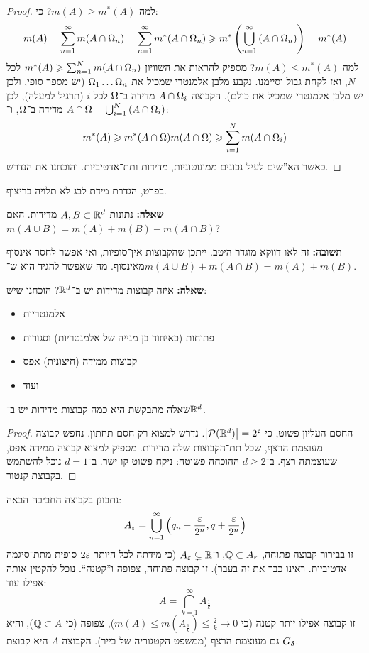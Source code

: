 \documentclass[name=רשימות פונקציות ממשיות – WIP]{../../../tex/classes/noChapterMegasumPreamble}
\begin{document}
	\begin{proof}
		למה $m(A) \ge m^*(A)$? כי: 
		\[ m(A) = \sum_{n =1}^{\infty}m(A \cap \Omega _n) = \sum_{n = 1}^{\infty}m^*(A \cap \Omega_n) \geqslant m^*\left ( \bigcup_{n = 1}^{\infty}\left ( A \cap \Omega _n \right ) \right ) = m^*(A) \]
		למה $m(A) \le m^*(A)$? מספיק להראות את השוויון $m^*(A) \geqslant \sum_{n = 1}^{N}m(A \cap \Omega _n)$ לכל $N$, ואז לקחת גבול וסיימנו. נקבע מלבן אלמנטרי שמכיל את $\Omega_1 \dots \Omega_n$ (יש מספר סופי, ולכן יש מלבן אלמנטרי שמכיל את כולם). הקבוצה $A \cap \Omega_i$ מדידה ב־$\Omega$ לכל $i$ (תרגיל למעלה), לכן $A \cap \Omega = \bigcup_{i = 1}^{N}\left ( A \cap \Omega_i \right )$ מדידה ב־$\Omega$, ו־: 
		\[ m^*(A) \geqslant m^*(A \cap \Omega) m(A \cap \Omega) \geqslant \sum_{i =1}^{N}m(A \cap \Omega_i) \]
		כאשר הא''שים לעיל נכונים ממונוטוניות, מדידות ותת־אדטיביות. 
		והוכחנו את הנדרש. 
	\end{proof}
	
	בפרט, הגדרת מידת לבג לא תלויה בריצוף. 
	
	\textbf{שאלה: }נתונות $A, B \subset \mathbb{R}^{d}$ מדידות. האם $m(A \cup B) = m(A) + m(B)- m(A \cap B)$? 
	
	\textbf{תשובה: }זה לאו דווקא מוגדר היטב. ייתכן שהקבוצות אין־סופיות, ואי אפשר לחסר אינסוף מאינסוף. מה שאפשר להגיד הוא ש־$m(A \cup B) + m(A \cap B) = m(A) + m(B)$. 
	
	\textbf{שאלה: }איזה קבוצות מדידות יש ב־$\mathbb{R}^{d}$? הוכחנו שיש: 
	\begin{itemize}
		\item אלמנטריות
		\item פתוחות (כאיחוד בן מנייה של אלמנטריות) וסגורות
		\item קבוצות ממידה (חיצונית) אפס
		\item ועוד
	\end{itemize}
	
	שאלה מתבקשת היא כמה קבוצות מדידות יש ב־$\mathbb{R}^{d}$. 
	\begin{proof}
		החסם העליון פשוט, כי $\left \lvert \mathcal{P}(\mathbb{R}^{d}) \right \rvert = 2^{\mathfrak{c}}$. נדרש למצוא רק חסם תחתון. נחפש קבוצה מעוצמת הרצף, שכל תת־הקבוצות שלה מדידות. מספיק למצוא קבוצה ממידה אפס, שעוצמתה רצף. ב־$d \ge 2$ ההוכחה פשוטה: ניקח פשוט קו ישר. ב־$d = 1$ נוכל להשתמש בקבוצת קנטור. 
	\end{proof}
	
	נתבונן בקבוצה החביבה הבאה: 
	\[ A_\eg = \bigcup_{n = 1}^{\infty}\cl{q_n - \frac{\eg}{2^{n}}, q + \frac{\eg}{2^{n}}} \]
	זו בבירור קבוצה פתוחה, $\Q \subset A_\eg$, ו־$A_\eg \subsetneq \R$ (כי מידתה לכל היותר $2\eg$ סופית מתת־סיגמה אדטיביות. ראינו כבר את זה בעבר). זו קבוצה פתוחה, צפופה ו''קטנה``. נוכל להקטין אותה אפילו עוד: 
	\[ A = \bigcap_{k = 1}^{\infty} A_{\frac{1}{k}} \]
	זו קבוצה אפילו יותר קטנה (כי $m(A) \le m(A_{\frac{1}{k}}) \le \frac{2}{k} \to 0$), צפופה (כי $\mathbb{Q}\subset A$), והיא גם מעוצמת הרצף (ממשפט הקטגוריה של בייר). הקבוצה $A$ היא קבוצת $G_\delta$. 
	
\end{document}
